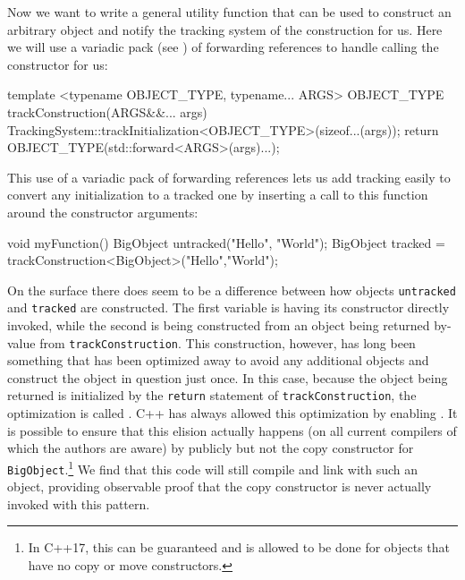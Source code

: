 \noindent Now we want to write a general utility function that can be used to
construct an arbitrary object and notify the tracking system of the
construction for us. Here we will use a variadic pack (see ) 
of forwarding references to handle
calling the constructor for us:

\begin{emcppslisting}[emcppsbatch=e10]
template <typename OBJECT_TYPE, typename... ARGS>
OBJECT_TYPE trackConstruction(ARGS&&... args)
{
    TrackingSystem::trackInitialization<OBJECT_TYPE>(sizeof...(args));
    return OBJECT_TYPE(std::forward<ARGS>(args)...);
}
\end{emcppslisting}

\noindent This use of a variadic pack of forwarding references lets us add tracking easily to convert any initialization to a
tracked one by inserting a call to this function around the constructor
arguments:

\begin{emcppslisting}[emcppsbatch=e10]
void myFunction()
{
    BigObject untracked("Hello", "World");
    BigObject tracked = trackConstruction<BigObject>("Hello","World");
}
\end{emcppslisting}

\noindent On the surface there does seem to be a difference between how
objects \lstinline!untracked! and \lstinline!tracked! are constructed. The first
variable is having its constructor directly invoked, while the second is
being constructed from an object being returned by-value from
\lstinline!trackConstruction!. This construction, however, has long been
something that has been optimized away to avoid any additional objects
and construct the object in question just once. In this case, because
the object being returned is initialized by the \lstinline!return!
statement of \lstinline!trackConstruction!, the optimization is called
. C++ has always
allowed this optimization by enabling . It is possible to ensure that this elision actually happens (on all current compilers of which the authors are aware) by publicly  but not  the copy
constructor for \lstinline!BigObject!.\footnote{In C++17,
this  can be guaranteed and is allowed to be done for
objects that have no copy or move constructors.} We find that this code will
still compile and link with such an object, providing observable proof
that the copy constructor is never actually invoked with this pattern.

